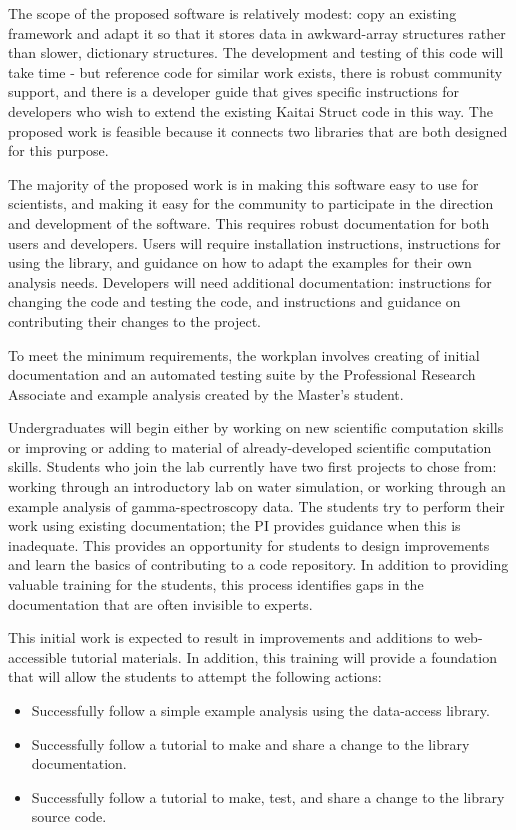 The scope of the proposed software is relatively modest: copy an existing framework and adapt it so that it stores data in awkward-array structures rather than slower, dictionary structures.  The development and testing of this code will take time - but reference code for similar work exists, there is robust community support, and there is a developer guide that gives specific instructions for developers who wish to extend the existing Kaitai Struct code in this way.  The proposed work is feasible because it connects two libraries that are both designed for this purpose.

The majority of the proposed work is in making this software easy to use for scientists, and making it easy for the community to participate in the direction and development of the software.  This requires robust documentation for both users and developers.  Users will require installation instructions, instructions for using the library, and guidance on how to adapt the examples for their own analysis needs.  Developers will need additional documentation: instructions for changing the code and testing the code, and instructions and guidance on contributing their changes to the project.

To meet the minimum requirements, the workplan involves creating of initial documentation and an automated testing suite by the Professional Research Associate and example analysis created by the Master's student.

Undergraduates will begin either by working on new scientific computation skills or improving or adding to material of already-developed scientific computation skills.  Students who join the lab currently have two first projects to chose from: working through an introductory lab on water simulation, or working through an example analysis of gamma-spectroscopy data.  The students try to perform their work using existing documentation; the PI provides guidance when this is inadequate.  This provides an opportunity for students to design improvements and learn the basics of contributing to a code repository.  In addition to providing valuable training for the students, this process identifies gaps in the documentation that are often invisible to experts.

This initial work is expected to result in improvements and additions to web-accessible tutorial materials.  In addition, this training will provide a foundation that will allow the students to attempt the following actions:

\begin{itemize}
    \item Successfully follow a simple example analysis using the data-access library.
    \item Successfully follow a tutorial to make and share a change to the library documentation.
    \item Successfully follow a tutorial to make, test, and share a change to the library source code.
\end{itemize}

